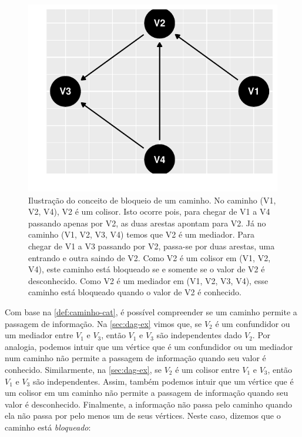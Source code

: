 \begin{knitrout}
\color{fgcolor}\begin{figure}[t]

{\centering \includegraphics[width=\maxwidth]{./figures/caminho-cat-1} 

}

\caption[Ilustração do conceito de bloqueio de um caminho]{Ilustração do conceito de bloqueio de um caminho. No caminho (V1, V2, V4), V2 é um colisor. Isto ocorre pois, para chegar de V1 a V4 passando apenas por V2, as duas arestas apontam para V2. Já no caminho (V1, V2, V3, V4) temos que V2 é um mediador. Para chegar de V1 a V3 passando por V2, passa-se por duas arestas, uma entrando e outra saindo de V2. Como V2 é um colisor em (V1, V2, V4), este caminho está bloqueado se e somente se o valor de V2 é desconhecido. Como V2 é um mediador em (V1, V2, V3, V4), esse caminho está bloqueado quando o valor de V2 é conhecido.}\label{fig:caminho-cat}
\end{figure}

\end{knitrout}

Com base na \cref{def:caminho-cat}, é
possível compreender se um caminho permite a
passagem de informação.
Na \cref{sec:dag-ex} vimos que,
se $V_2$ é um confundidor ou um mediador entre
$V_1$ e $V_3$, então
$V_1$ e $V_3$ são independentes dado $V_2$.
Por analogia, podemos intuir que um vértice que
é um confundidor ou um mediador num caminho
não permite a passagem de informação
quando seu valor é conhecido.
Similarmente, na \cref{sec:dag-ex},
se $V_2$ é um colisor entre
$V_1$ e $V_3$, então 
$V_1$ e $V_3$ são independentes.
Assim, também podemos intuir que um vértice que
é um colisor em um caminho não permite
a passagem de informação quando seu valor é desconhecido.
Finalmente, a informação não passa pelo caminho quando
ela não passa por pelo menos um de seus vértices.
Neste caso, dizemos que o caminho está \textit{bloqueado}:

